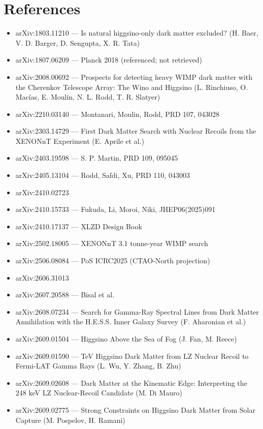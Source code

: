 \documentclass[11pt,a4paper]{article}
\begin{document}
\section*{References}
\begin{itemize}
\item arXiv:1803.11210 --- Is natural higgsino-only dark matter excluded? (H. Baer, V. D. Barger, D. Sengupta, X. R. Tata)
\item arXiv:1807.06209 --- Planck 2018 (referenced; not retrieved)
\item arXiv:2008.00692 --- Prospects for detecting heavy WIMP dark matter with the Cherenkov Telescope Array: The Wino and Higgsino (L. Rinchiuso, O. Macías, E. Moulin, N. L. Rodd, T. R. Slatyer)
\item arXiv:2210.03140 --- Montanari, Moulin, Rodd, PRD 107, 043028
\item arXiv:2303.14729 --- First Dark Matter Search with Nuclear Recoils from the XENONnT Experiment (E. Aprile et al.)
\item arXiv:2403.19598 --- S. P. Martin, PRD 109, 095045
\item arXiv:2405.13104 --- Rodd, Safdi, Xu, PRD 110, 043003
\item arXiv:2410.02723
\item arXiv:2410.15733 --- Fukuda, Li, Moroi, Niki, JHEP06(2025)091
\item arXiv:2410.17137 --- XLZD Design Book
\item arXiv:2502.18005 --- XENONnT 3.1 tonne-year WIMP search
\item arXiv:2506.08084 --- PoS ICRC2025 (CTAO-North projection)
\item arXiv:2606.31013
\item arXiv:2607.20588 --- Bisal et al.
\item arXiv:2608.07234 --- Search for Gamma-Ray Spectral Lines from Dark Matter Annihilation with the H.E.S.S. Inner Galaxy Survey (F. Aharonian et al.)
\item arXiv:2609.01504 --- Higgsino Above the Sea of Fog (J. Fan, M. Reece)
\item arXiv:2609.01590 --- TeV Higgsino Dark Matter from LZ Nuclear Recoil to Fermi-LAT Gamma Rays (L. Wu, Y. Zhang, B. Zhu)
\item arXiv:2609.02608 --- Dark Matter at the Kinematic Edge: Interpreting the 248 keV LZ Nuclear-Recoil Candidate (M. Di Mauro)
\item arXiv:2609.02775 --- Strong Constraints on Higgsino Dark Matter from Solar Capture (M. Pospelov, H. Ramani)

\end{itemize}
\end{document}
